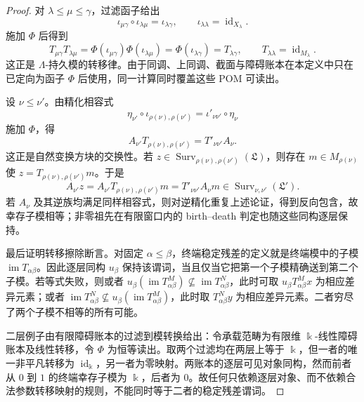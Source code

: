 \begin{proof}
对 \(\lambda\leq\mu\leq\gamma\)，过滤函子给出
\[
   \iota_{\mu\gamma}\circ\iota_{\lambda\mu}=\iota_{\lambda\gamma},
   \qquad \iota_{\lambda\lambda}=\operatorname{id}_{X_\lambda} .
\]
施加 \(\Phi\) 后得到
\[
   T_{\mu\gamma}T_{\lambda\mu}
   =\Phi(\iota_{\mu\gamma})\Phi(\iota_{\lambda\mu})
   =\Phi(\iota_{\lambda\gamma})
   =T_{\lambda\gamma},
   \qquad T_{\lambda\lambda}=\operatorname{id}_{M_\lambda} .
\]
这正是 \(\Lambda\)-持久模的转移律。由于同调、上同调、截面与障碍账本在本定义中只在已定向为函子 \(\Phi\) 后使用，同一计算同时覆盖这些 POM 可读出。

设 \(\nu\leq\nu'\)。由精化相容式
\[
   \eta_{\nu'}\circ \iota_{\rho(\nu),\rho(\nu')}
   =\iota'_{\nu\nu'}\circ\eta_\nu
\]
施加 \(\Phi\)，得
\[
   A_{\nu'}T_{\rho(\nu),\rho(\nu')}
   =T'_{\nu\nu'}A_\nu .
\]
这正是自然变换方块的交换性。若
\(z\in\operatorname{Surv}_{\rho(\nu),\rho(\nu')}(\mathfrak L)\)，则存在 \(m\in M_{\rho(\nu)}\) 使
\(z=T_{\rho(\nu),\rho(\nu')}m\)。于是
\[
   A_{\nu'}z
   =A_{\nu'}T_{\rho(\nu),\rho(\nu')}m
   =T'_{\nu\nu'}A_\nu m
   \in\operatorname{Surv}_{\nu,\nu'}(\mathfrak L') .
\]
若 \(A_\nu\) 及其逆族均满足同样相容式，则对逆精化重复上述论证，得到反向包含，故幸存子模相等；非零祖先在有限窗口内的 birth--death 判定也随这些同构逐层保持。

最后证明转移擦除断言。对固定 \(\alpha\leq\beta\)，终端稳定残差的定义就是终端模中的子模 \(\operatorname{im}T_{\alpha\beta}\)。因此逐层同构 \(u_\beta\) 保持该谓词，当且仅当它把第一个子模精确送到第二个子模。若等式失败，则或者
\(u_\beta(\operatorname{im}T^M_{\alpha\beta})\not\subseteq\operatorname{im}T^N_{\alpha\beta}\)，此时可取
\(u_\beta T^M_{\alpha\beta}x\) 为相应差异元素；或者
\(\operatorname{im}T^N_{\alpha\beta}\not\subseteq u_\beta(\operatorname{im}T^M_{\alpha\beta})\)，此时取
\(T^N_{\alpha\beta}y\) 为相应差异元素。二者穷尽了两个子模不相等的所有可能。

二层例子由有限障碍账本的过滤到模转换给出：令承载范畴为有限维 \(\Bbbk\)-线性障碍账本及线性转移，令 \(\Phi\) 为恒等读出。取两个过滤均在两层上等于 \(\Bbbk\)，但一者的唯一非平凡转移为 \(\operatorname{id}_{\Bbbk}\)，另一者为零映射。两账本的逐层可见对象同构，然而前者从 \(0\) 到 \(1\) 的终端幸存子模为 \(\Bbbk\)，后者为 \(0\)。故任何只依赖逐层对象、而不依赖合法参数转移映射的规则，不能同时等于二者的稳定残差谓词。
\end{proof}
